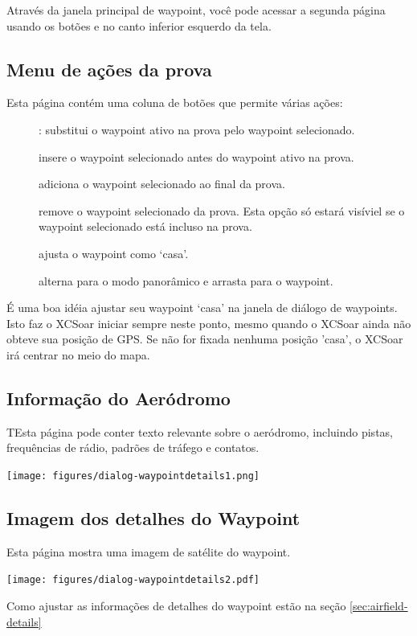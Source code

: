Através da janela principal de waypoint, você pode acessar a segunda página usando os botões 
\bmenuw{$>$} e \bmenuw{$<$} no canto inferior esquerdo da tela.  
\subsection*{Menu de ações da prova}  
Esta página contém uma coluna de botões que permite várias ações:
\begin{description}
\item[] :  substitui o waypoint ativo na prova pelo waypoint selecionado.
\item[] insere o waypoint selecionado antes do waypoint ativo na prova.
\item[] adiciona o waypoint selecionado ao final da prova.
\item[] remove o waypoint selecionado da prova.  Esta opção só estará visíviel se o waypoint selecionado está incluso na prova.
\item[] ajusta o waypoint como ‘casa’.
\item[] alterna para o modo panorâmico e arrasta para o waypoint.
\end{description}

É uma boa idéia ajustar seu waypoint ‘casa’ na janela de diálogo de waypoints.  Isto faz o XCSoar iniciar sempre neste ponto, mesmo quando o XCSoar ainda não obteve sua posição de GPS.  Se não for fixada nenhuma posição 'casa', o XCSoar irá centrar no meio do mapa.

\subsection*{Informação do Aeródromo}
TEsta página pode conter texto relevante sobre o aeródromo, incluindo pistas, frequências de rádio, padrões de tráfego e contatos.
\begin{center}
\texttt{[image: figures/dialog-waypointdetails1.png]}
\end{center}

\subsection*{Imagem dos detalhes do Waypoint}
Esta página mostra uma imagem de satélite do waypoint.

\begin{center}
\texttt{[image: figures/dialog-waypointdetails2.pdf]}
\end{center}
Como ajustar as informações de detalhes do waypoint estão na seção \ref{sec:airfield-details}

